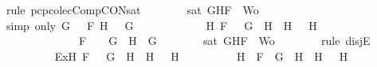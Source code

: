 \begin{isabellebody}
\ {\isacharparenleft}rule\ pcp{\isacharunderscore}colecComp{\isacharunderscore}CON{\isacharunderscore}sat{}{\isacharparenright}\isanewline
\ \ \ \ \ \ \isamarkupfalse%
\ {\isachardoublequoteopen}sat\ {\isacharparenleft}{\isacharbraceleft}G{\isacharcomma}H{\isacharcomma}F{\isacharbraceright}\ {\isasymunion}\ Wo{\isacharparenright}{\isachardoublequoteclose}\isanewline
\ \ \ \ \ \ \ \ \isamarkupfalse%
\ {\isacharparenleft}simp\ only{\isacharcolon}\ {\isacartoucheopen}G\ {\isacharequal}\ \isactrlbold {\isasymnot}\ F{}{\isacartoucheclose}\ {\isacartoucheopen}H\ {\isacharequal}\ \isactrlbold {\isasymnot}\ G{}{\isacartoucheclose}{\isacharparenright}\isanewline
\ \ \ \ \isamarkupfalse%
\isanewline
\ \ \ \ \ \ \isamarkupfalse%
\ {\isachardoublequoteopen}{\isacharparenleft}{\isasymexists}H{}{\isachardot}\ F\ {\isacharequal}\ \isactrlbold {\isasymnot}\ {\isacharparenleft}G\ \isactrlbold {\isasymrightarrow}\ H{}{\isacharparenright}\ {\isasymand}\ H\ {\isacharequal}\ \isactrlbold {\isasymnot}\ H{}{\isacharparenright}\ {\isasymor}\ \isanewline
\ \ \ \ \ \ \ \ \ \ \ \ \ \ F\ {\isacharequal}\ \isactrlbold {\isasymnot}\ {\isacharparenleft}\isactrlbold {\isasymnot}\ G{\isacharparenright}\ {\isasymand}\ H\ {\isacharequal}\ G{\isachardoublequoteclose}\isanewline
\ \ \ \ \ \ \isamarkupfalse%
\ {\isachardoublequoteopen}sat\ {\isacharparenleft}{\isacharbraceleft}G{\isacharcomma}H{\isacharcomma}F{\isacharbraceright}\ {\isasymunion}\ Wo{\isacharparenright}{\isachardoublequoteclose}\isanewline
\ \ \ \ \ \ \isamarkupfalse%
\ {\isacharparenleft}rule\ disjE{\isacharparenright}\isanewline
\ \ \ \ \ \ \ \ \isamarkupfalse%
\ Ex{}{\isacharcolon}{\isachardoublequoteopen}{\isasymexists}H{}{\isachardot}\ F\ {\isacharequal}\ \isactrlbold {\isasymnot}\ {\isacharparenleft}G\ \isactrlbold {\isasymrightarrow}\ H{}{\isacharparenright}\ {\isasymand}\ H\ {\isacharequal}\ \isactrlbold {\isasymnot}\ H{}{\isachardoublequoteclose}\isanewline
\ \ \ \ \ \ \ \ \isamarkupfalse%
\ H{}\ \ {}{\isacharcolon}{\isachardoublequoteopen}F\ {\isacharequal}\ \isactrlbold {\isasymnot}{\isacharparenleft}G\ \isactrlbold {\isasymrightarrow}\ H{}{\isacharparenright}\ {\isasymand}\ H\ {\isacharequal}\ \isactrlbold {\isasymnot}\ H{}{\isachardoublequoteclose}\isanewline
\ \ \ \ \ \ \ \ \ \ \isamarkupfalse%

\end{isabellebody}
